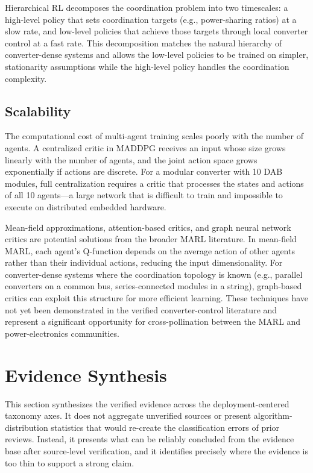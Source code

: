 \documentclass[manuscript,screen,review]{acmart}
\begin{document}
Hierarchical RL decomposes the coordination problem into two timescales: a high-level policy that sets coordination targets (e.g., power-sharing ratios) at a slow rate, and low-level policies that achieve those targets through local converter control at a fast rate.
This decomposition matches the natural hierarchy of converter-dense systems and allows the low-level policies to be trained on simpler, stationarity assumptions while the high-level policy handles the coordination complexity.

\subsection{Scalability}

The computational cost of multi-agent training scales poorly with the number of agents.
A centralized critic in MADDPG receives an input whose size grows linearly with the number of agents, and the joint action space grows exponentially if actions are discrete.
For a modular converter with 10 DAB modules, full centralization requires a critic that processes the states and actions of all 10 agents---a large network that is difficult to train and impossible to execute on distributed embedded hardware.

Mean-field approximations, attention-based critics, and graph neural network critics are potential solutions from the broader MARL literature.
In mean-field MARL, each agent's Q-function depends on the average action of other agents rather than their individual actions, reducing the input dimensionality.
For converter-dense systems where the coordination topology is known (e.g., parallel converters on a common bus, series-connected modules in a string), graph-based critics can exploit this structure for more efficient learning.
These techniques have not yet been demonstrated in the verified converter-control literature and represent a significant opportunity for cross-pollination between the MARL and power-electronics communities.

\section{Evidence Synthesis}
\label{sec:synthesis}

This section synthesizes the verified evidence across the deployment-centered taxonomy axes.
It does not aggregate unverified sources or present algorithm-distribution statistics that would re-create the classification errors of prior reviews.
Instead, it presents what can be reliably concluded from the evidence base after source-level verification, and it identifies precisely where the evidence is too thin to support a strong claim.
\end{document}
